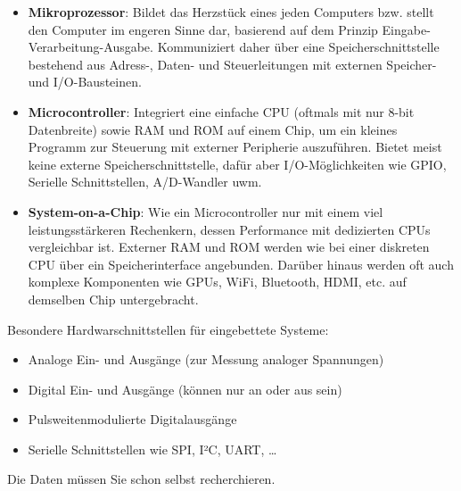 \begin{itemize}
    \item \textbf{Mikroprozessor}:
    Bildet das Herzstück eines jeden Computers bzw. stellt den Computer im engeren
    Sinne dar, basierend auf dem Prinzip Eingabe-Verarbeitung-Ausgabe. Kommuniziert
    daher über eine Speicherschnittstelle bestehend aus Adress-, Daten- und Steuerleitungen
    mit externen Speicher- und I/O-Bausteinen.

    \item \textbf{Microcontroller}:
    Integriert eine einfache CPU (oftmals mit nur 8-bit Datenbreite)
    sowie RAM und ROM auf einem Chip, um ein kleines Programm zur
    Steuerung mit externer Peripherie auszuführen. Bietet meist keine
    externe Speicherschnittstelle, dafür aber I/O-Möglichkeiten wie
    GPIO, Serielle Schnittstellen, A/D-Wandler uwm.

    \item \textbf{System-on-a-Chip}:
    Wie ein Microcontroller nur mit einem viel leistungsstärkeren
    Rechenkern, dessen Performance mit dedizierten CPUs vergleichbar ist.
    Externer RAM und ROM werden wie bei einer diskreten CPU über
    ein Speicherinterface angebunden. Darüber hinaus werden oft auch
    komplexe Komponenten wie GPUs, WiFi, Bluetooth, HDMI, etc.
    auf demselben Chip untergebracht.
\end{itemize}

\bigskip
\teilaufgabe
Besondere Hardwarschnittstellen für eingebettete Systeme:

\begin{itemize}
    \item Analoge Ein- und Ausgänge (zur Messung analoger Spannungen)
    \item Digital Ein- und Ausgänge (können nur an oder aus sein)
    \item Pulsweitenmodulierte Digitalausgänge
    \item Serielle Schnittstellen wie SPI, I²C, UART, \ldots
\end{itemize}

Die Daten müssen Sie schon selbst recherchieren. \smiley


